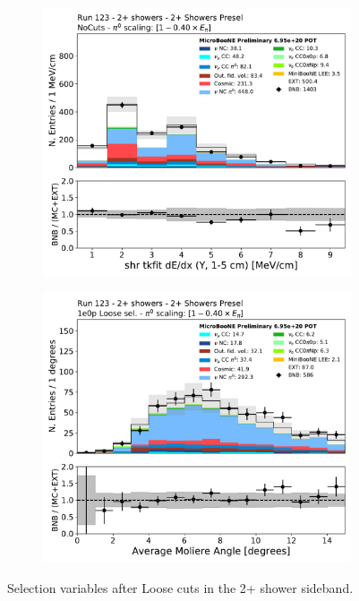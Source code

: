 \begin{figure}[H]
\begin{center}
\begin{subfigure}{0.45\textwidth}
    \end{subfigure} \\
    \begin{subfigure}{0.45\textwidth}
    \includegraphics[width=1.00\textwidth]{Sidebands/Figures/TwoShr_1e0pSel_newSamples/shr_tkfit_gap10_dedx_Y_loose.pdf}
    \end{subfigure}
    \begin{subfigure}{0.45\textwidth}
    \includegraphics[width=1.00\textwidth]{Sidebands/Figures/TwoShr_1e0pSel_newSamples/shrmoliereavg_loose.pdf}
    \end{subfigure}
    \caption{\label{fig:sb:1eZp:twopshr:loose:vars1} Selection variables after \zpsel Loose cuts in the 2+ shower sideband.}
    \end{center}
\end{figure}

